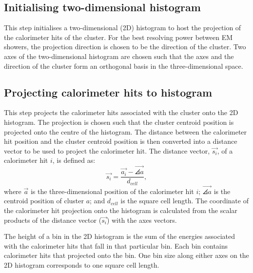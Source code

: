 \subsection{Initialising  two-dimensional histogram}

This step initialises a two-dimensional (2D) histogram to host the projection of the calorimeter hits of the cluster. For the best resolving power between EM showers, the projection direction is chosen to be the direction of the cluster. Two axes of the two-dimensional histogram are chosen such that the axes and the direction of the cluster form an orthogonal basis  in the three-dimensional space.




\subsection{Projecting calorimeter hits to histogram}

This step projects the calorimeter hits associated with the cluster onto the 2D histogram. The projection is chosen such that the cluster centroid position is projected onto the centre of the histogram. The distance between the calorimeter hit position and the cluster centroid position is then converted into a distance vector to be used to project the calorimeter hit. The distance vector, $\vec{s_{i}}$, of a calorimeter hit $i$, is defined as:
\begin{equation}
\vec{s_{i}} = \frac{\vec{a_{i}} -  \vec{\angles{a}}}{d_{cell}},
\end{equation}
where $\vec{a}$ is the three-dimensional position of the calorimeter hit $i$;  $\vec{\angles{a}}$ is the centroid position of cluster $a$; and $d_{cell}$ is the  \ECAL square cell length. The coordinate of the calorimeter hit projection onto the histogram is calculated from the scalar products of the distance vector ($\vec{s_{i}}$) with the axes vectors.

The height of a bin in the 2D histogram is the sum of the energies associated with the calorimeter hits that fall in that particular bin. Each bin contains calorimeter hits that projected onto the bin. One bin size along either axes on the 2D histogram corresponds to one \ECAL square cell length.

